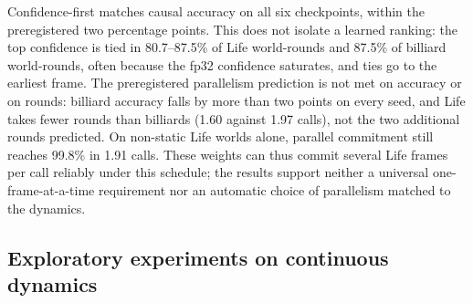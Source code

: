 \documentclass[11pt]{article}
\begin{document}
\begin{table}[h]
\centering
\caption{\textbf{Commitment order in the plain depth-8 denoiser.} SeqAcc (\%) and mean network calls per rollout, all worlds; means over seeds 42/43/44, CPU fp32 reruns of the checkpoints of Figure~\ref{fig:billiardsfull}.}
\label{tab:plainorder}
\small
{}
\end{table}

Confidence-first matches causal accuracy on all six checkpoints, within the preregistered two percentage points. This does not isolate a learned ranking: the top confidence is tied in 80.7--87.5\% of Life world-rounds and 87.5\% of billiard world-rounds, often because the fp32 confidence saturates, and ties go to the earliest frame. The preregistered parallelism prediction is not met on accuracy or on rounds: billiard accuracy falls by more than two points on every seed, and Life takes fewer rounds than billiards (1.60 against 1.97 calls), not the two additional rounds predicted. On non-static Life worlds alone, parallel commitment still reaches 99.8\% in 1.91 calls. These weights can thus commit several Life frames per call reliably under this schedule; the results support neither a universal one-frame-at-a-time requirement nor an automatic choice of parallelism matched to the dynamics.

\subsection{Exploratory experiments on continuous dynamics}
\label{app:bridge}
\providecommand{\capitem}[1]{\par\hangindent=0.9em\hangafter=1\noindent\makebox[0.9em][l]{\textbullet}\textbf{#1}~}
\end{document}
